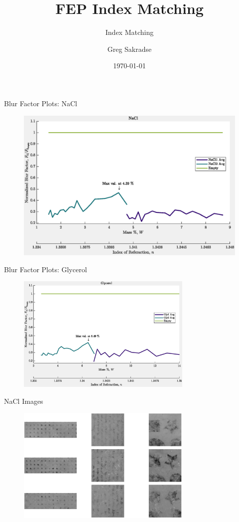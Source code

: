 \documentclass[10pt]{beamer}
\title{FEP Index Matching}
\subtitle{Index Matching}
\date{\today}
\author{Greg Sakradse}
\begin{document}
\begin{frame}{Blur Factor Plots: NaCl}
\begin{figure}
    \centering
    \includegraphics[width = 0.75 \textwidth]{figs/NaCl_BlurPlot.eps}
    \label{NaClBlur}
\end{figure}
    
\end{frame}

\begin{frame}{Blur Factor Plots: Glycerol}
\begin{figure}
    \centering
    \includegraphics[width = 0.75\textwidth]{figs/Gly_BlurPlot.eps}
    \label{GlyBlur}
\end{figure}
    
\end{frame}

\begin{frame}{NaCl Images}
\begin{figure}
    \centering
    \includegraphics[width = 0.75\textwidth]{figs/NaCl_Imgs002.eps}
    \label{NaClImg}
\end{figure}
\end{frame}
\end{document}
